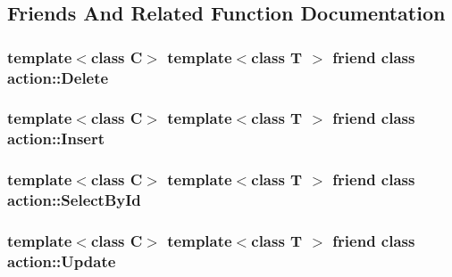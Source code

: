 \subsection{Friends And Related Function Documentation}
\hypertarget{classdbo_1_1ptr_ae779179e16547c9a93329dd197385493}{
\subsubsection[{action\+::\+Delete}]{\setlength{\rightskip}{0pt plus 5cm}template$<$class C$>$ template$<$class T $>$ friend class {\bf action\+::\+Delete}\hspace{0.3cm}{\ttfamily [friend]}}}\label{classdbo_1_1ptr_ae779179e16547c9a93329dd197385493}
\hypertarget{classdbo_1_1ptr_a88a9b73e2cb3304941371508b660e53e}{
\subsubsection[{action\+::\+Insert}]{\setlength{\rightskip}{0pt plus 5cm}template$<$class C$>$ template$<$class T $>$ friend class {\bf action\+::\+Insert}\hspace{0.3cm}{\ttfamily [friend]}}}\label{classdbo_1_1ptr_a88a9b73e2cb3304941371508b660e53e}
\hypertarget{classdbo_1_1ptr_a8b98481706995f8b3e2665f74b2b3039}{
\subsubsection[{action\+::\+Select\+By\+Id}]{\setlength{\rightskip}{0pt plus 5cm}template$<$class C$>$ template$<$class T $>$ friend class {\bf action\+::\+Select\+By\+Id}\hspace{0.3cm}{\ttfamily [friend]}}}\label{classdbo_1_1ptr_a8b98481706995f8b3e2665f74b2b3039}
\hypertarget{classdbo_1_1ptr_a90af99826aea472a0aa22e59376fed0f}{
\subsubsection[{action\+::\+Update}]{\setlength{\rightskip}{0pt plus 5cm}template$<$class C$>$ template$<$class T $>$ friend class {\bf action\+::\+Update}\hspace{0.3cm}{\ttfamily [friend]}}}\label{classdbo_1_1ptr_a90af99826aea472a0aa22e59376fed0f}
